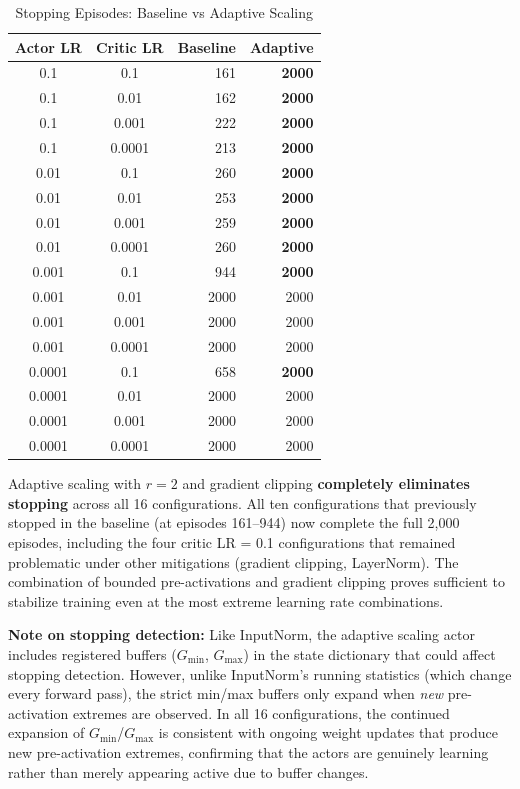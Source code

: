 \begin{table}[htbp]
\caption{Stopping Episodes: Baseline vs Adaptive Scaling}
\label{tab:adaptive_stopping}
\centering
\small
\begin{tabular}{ccrr}
\toprule
\textbf{Actor LR} & \textbf{Critic LR} & \textbf{Baseline} & \textbf{Adaptive} \\
\midrule
0.1 & 0.1 & 161 & \textbf{2000} \\
0.1 & 0.01 & 162 & \textbf{2000} \\
0.1 & 0.001 & 222 & \textbf{2000} \\
0.1 & 0.0001 & 213 & \textbf{2000} \\
0.01 & 0.1 & 260 & \textbf{2000} \\
0.01 & 0.01 & 253 & \textbf{2000} \\
0.01 & 0.001 & 259 & \textbf{2000} \\
0.01 & 0.0001 & 260 & \textbf{2000} \\
0.001 & 0.1 & 944 & \textbf{2000} \\
0.001 & 0.01 & 2000 & 2000 \\
0.001 & 0.001 & 2000 & 2000 \\
0.001 & 0.0001 & 2000 & 2000 \\
0.0001 & 0.1 & 658 & \textbf{2000} \\
0.0001 & 0.01 & 2000 & 2000 \\
0.0001 & 0.001 & 2000 & 2000 \\
0.0001 & 0.0001 & 2000 & 2000 \\
\bottomrule
\end{tabular}
\end{table}

Adaptive scaling with $r = 2$ and gradient clipping \textbf{completely eliminates stopping} across all 16 configurations. All ten configurations that previously stopped in the baseline (at episodes 161--944) now complete the full 2,000 episodes, including the four critic LR = 0.1 configurations that remained problematic under other mitigations (gradient clipping, LayerNorm). The combination of bounded pre-activations and gradient clipping proves sufficient to stabilize training even at the most extreme learning rate combinations.

\textbf{Note on stopping detection:} Like InputNorm, the adaptive scaling actor includes registered buffers ($G_\text{min}$, $G_\text{max}$) in the state dictionary that could affect stopping detection. However, unlike InputNorm's running statistics (which change every forward pass), the strict min/max buffers only expand when \textit{new} pre-activation extremes are observed. In all 16 configurations, the continued expansion of $G_\text{min}$/$G_\text{max}$ is consistent with ongoing weight updates that produce new pre-activation extremes, confirming that the actors are genuinely learning rather than merely appearing active due to buffer changes.

